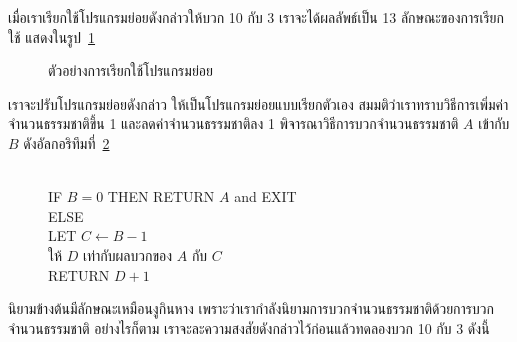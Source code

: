 เมื่อ{\wbr}เรา{\wbr}เรียก{\wbr}ใช้{\wbr}โปรแกรมย่อย{\wbr}ดังกล่าว{\wbr}ให้{\wbr}บวก 10 กับ 3 เรา{\wbr}จะ{\wbr}ได้{\wbr}ผลลัพธ์{\wbr}เป็น 13
ลักษณะ{\wbr}ของ{\wbr}การ{\wbr}เรียก{\wbr}ใช้ แสดง{\wbr}ใน{\wbr}รูป~\ref{rec:add-call}

\begin{figure}
\begin{center}
\end{center}
\caption{ตัวอย่าง{\wbr}การ{\wbr}เรียก{\wbr}ใช้{\wbr}โปรแกรมย่อย}
\label{rec:add-call}
\end{figure}

เรา{\wbr}จะ{\wbr}ปรับ{\wbr}โปรแกรมย่อย{\wbr}ดังกล่าว ให้{\wbr}เป็น{\wbr}โปรแกรมย่อย{\wbr}แบบ{\wbr}เรียก{\wbr}ตัวเอง{\wbr}
สมมติ{\wbr}ว่า{\wbr}เรา{\wbr}ทราบ{\wbr}วิธีการ{\wbr}เพิ่ม{\wbr}ค่า{\wbr}จำนวน{\wbr}ธรรมชาติ{\wbr}ขึ้น 1 และ{\wbr}ลด{\wbr}ค่า{\wbr}จำนวน{\wbr}ธรรมชาติ{\wbr}ลง 1
พิจารณา{\wbr}วิธีการ{\wbr}บวก{\wbr}จำนวน{\wbr}ธรรมชาติ $A$ เข้า{\wbr}กับ $B$
ดัง{\wbr}อัล{\wbr}กอ{\wbr}ริ{\wbr}ทึม{\wbr}ที่~\ref{algo:rec-int-add}

\begin{figure}
\begin{algt}
\label{algo:rec-int-add}
\\
\hspace*{0.2in} IF $B=0$ THEN RETURN $A$ and EXIT\\
\hspace*{0.2in} ELSE\\
\hspace*{0.2in}\hspace*{0.2in} LET $C\leftarrow B-1$\\
\hspace*{0.2in}\hspace*{0.2in} ให้ $D$ เท่า{\wbr}กับ{\wbr}ผลบวก{\wbr}ของ $A$ กับ $C$\\
\hspace*{0.2in}\hspace*{0.2in} RETURN $D+1$
\end{algt}
\end{figure}

นิยาม{\wbr}ข้างต้น{\wbr}มี{\wbr}ลักษณะ{\wbr}เหมือน{\wbr}งู{\wbr}กิน{\wbr}หาง{\wbr}
เพราะว่า{\wbr}เรา{\wbr}กำลัง{\wbr}นิยาม{\wbr}การ{\wbr}บวก{\wbr}จำนวน{\wbr}ธรรมชาติ{\wbr}ด้วย{\wbr}การ{\wbr}บวก{\wbr}จำนวน{\wbr}ธรรมชาติ อย่างไรก็ตาม{\wbr}
เรา{\wbr}จะ{\wbr}ละ{\wbr}ความ{\wbr}สงสัย{\wbr}ดังกล่าว{\wbr}ไว้{\wbr}ก่อน{\wbr}แล้ว{\wbr}ทดลอง{\wbr}บวก 10 กับ 3 ดังนี้{\wbr}


